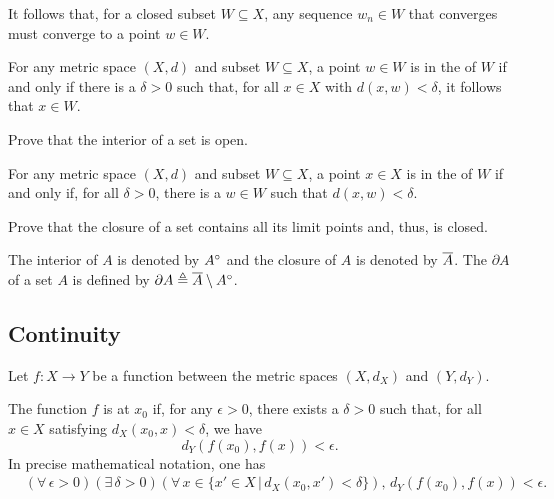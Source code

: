 It follows that, for a closed subset $W \subseteq X$, any sequence $w_n \in W$ that converges must converge to a point $w \in W$.

\begin{definition}
For any metric space $(X,d)$ and subset $W \subseteq X$, a point $w\in W$ is in the  of $W$ if and only if there is a $\delta >0$ such that, for all $x\in X$ with $d(x,w)<\delta$, it follows that $x\in W$.
\end{definition}

\begin{problem}
Prove that the interior of a set is open.
\end{problem}

\begin{definition}
For any metric space $(X,d)$ and subset $W \subseteq X$, a point $x\in X$ is in the  of $W$ if and only if, for all $\delta >0$, there is a $w\in W$ such that $d(x,w)<\delta$.
\end{definition}

\begin{problem}
Prove that the closure of a set contains all its limit points and, thus, is closed.
\end{problem}

The interior of $A$ is denoted by ${A}^{\circ}$ and the closure of $A$ is denoted by $\overline{A}$.
The  $\partial A$ of a set $A$ is defined by $\partial A \triangleq \overline{A} \setminus {A}^{\circ}$.

\subsection{Continuity}

Let $f \colon X \rightarrow Y$ be a function between the metric spaces $(X,d_X)$ and $(Y,d_Y)$.

\begin{definition} \label{def:continuous_x0}
The function $f$ is  at $x_0$ if, for any $\epsilon> 0$, there exists a $\delta >0$ such that, for all $x\in X$ satisfying $d_X(x_0,x)< \delta$, we have 
\[ d_Y \left( f(x_0),f(x) \right) < \epsilon .\]
In precise mathematical notation, one has
\begin{equation*}
\begin{split}
&(\forall \, \epsilon >0) ( \exists \, \delta >0)(\forall \, x \in \{x'\in X\,|\,d_X (x_0,x')<\delta\}),  \, d_Y \left( f(x_0),f(x) \right) < \epsilon .
\end{split}
\end{equation*}
\end{definition}


